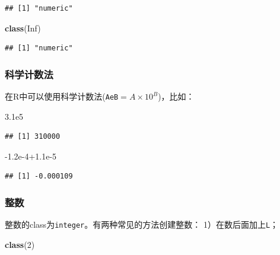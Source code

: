 \documentclass[]{book}
\newenvironment{Shaded}{\begin{snugshade}}{\end{snugshade}}
\newcommand{\DecValTok}[1]{\textcolor[rgb]{0.00,0.00,0.81}{#1}}
\newcommand{\FloatTok}[1]{\textcolor[rgb]{0.00,0.00,0.81}{#1}}
\newcommand{\KeywordTok}[1]{\textcolor[rgb]{0.13,0.29,0.53}{\textbf{#1}}}
\newcommand{\NormalTok}[1]{#1}
\newcommand{\OtherTok}[1]{\textcolor[rgb]{0.56,0.35,0.01}{#1}}
\begin{document}
\begin{verbatim}
## [1] "numeric"
\end{verbatim}

\begin{Shaded}
\begin{Highlighting}[]
\KeywordTok{class}\NormalTok{(}\OtherTok{Inf}\NormalTok{)}
\end{Highlighting}
\end{Shaded}

\begin{verbatim}
## [1] "numeric"
\end{verbatim}

\hypertarget{math-sci-not}{%
\subsubsection{科学计数法}\label{math-sci-not}}

在R中可以使用科学计数法(\texttt{AeB}\(= A \times 10^B\))，比如：

\begin{Shaded}
\begin{Highlighting}[]
\FloatTok{3.1e5}
\end{Highlighting}
\end{Shaded}

\begin{verbatim}
## [1] 310000
\end{verbatim}

\begin{Shaded}
\begin{Highlighting}[]
\FloatTok{-1.2e-4+1.1e-5}
\end{Highlighting}
\end{Shaded}

\begin{verbatim}
## [1] -0.000109
\end{verbatim}

\hypertarget{math-int-nums}{%
\subsubsection{整数}\label{math-int-nums}}

整数的class为\texttt{integer}。有两种常见的方法创建整数：
1）在数后面加上\texttt{L}；

\begin{Shaded}
\begin{Highlighting}[]
\KeywordTok{class}\NormalTok{(}\DecValTok{2}\NormalTok{)}
\end{Highlighting}
\end{Shaded}
\end{document}
